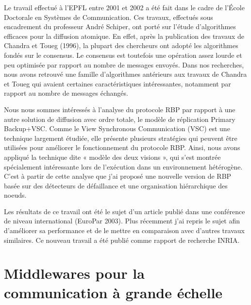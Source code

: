 \documentclass[a4paper]{book}
\begin{document}
Le travail effectué à l'EPFL entre 2001 et 2002 a été fait dans le cadre de l'École Doctorale en Systèmes de Communication. Ces travaux, effectués sous encadrement du professeur André Schiper, ont porté sur l'étude d'algorithmes efficaces pour la diffusion atomique. En effet, après la publication des travaux de Chandra et Toueg (1996), la plupart des chercheurs ont adopté les algorithmes fondés sur le consensus. Le consensus est toutefois une opération assez lourde et peu optimisée par rapport au nombre de messages envoyés. Dans nos recherches, nous avons retrouvé une famille d'algorithmes antérieurs aux travaux de Chandra et Toueg qui avaient certaines caractéristiques intéressantes, notamment par rapport au nombre de messages échangés.

Nous nous sommes intéressés à l'analyse du protocole RBP par rapport à une autre solution de diffusion avec ordre totale, le modèle de réplication Primary Backup+VSC. Comme le View Synchronous Communication (VSC) est une technique largement étudiée, elle présente plusieurs stratégies qui peuvent être utilisées pour améliorer le fonctionnement du protocole RBP. Ainsi, nous avons appliqué la technique dite « modèle des deux visions », qui s'est montrée spécialement intéressante lors de l'exécution dans un environnement hétérogène. C'est à partir de cette analyse que j'ai proposé une nouvelle version de RBP basée sur des détecteurs de défaillance et une organisation hiérarchique des noeuds.

Les résultats de ce travail ont été le sujet d'un article publié dans une conférence de niveau international (EuroPar 2003). Plus récemment j'ai repris le sujet afin d'améliorer sa performance et de le mettre en comparaison avec d'autres travaux similaires. Ce nouveau travail a été publié comme rapport de recherche INRIA.



\section{Middlewares pour la communication à grande échelle}
\end{document}

